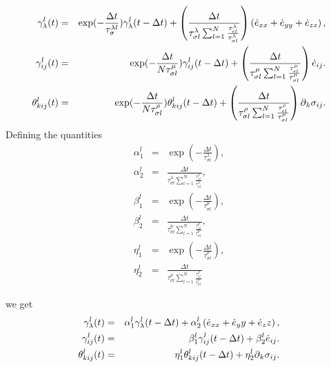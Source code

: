 \documentclass[11pt]{article}
\begin{document}
{\begin{eqnarray}
\gamma^l_{\lambda}(t) & = &
            \exp(-\frac{\Delta t}{\tau^{\lambda l}_{\sigma}})\gamma^l_{\lambda}(t-\Delta t)
            +\left(\frac{\Delta t}{\tau^{\lambda}_{\sigma l}
            \sum_{l=1}^N\frac{\tau^{\lambda}_{\epsilon l}}{\tau^{\lambda}_{\sigma l}}}\right)
             \left(\dot{e}_{xx}+ \dot{e}_{yy}+\dot{e}_{zz}\right) ,\nonumber\\
\gamma^l_{ij}(t) & = &
            \exp(-\frac{\Delta t}{N\tau^{\mu}_{\sigma l}})\gamma^l_{ij}(t-\Delta t)
            + \left(\frac{\Delta t}{\tau^{\mu}_{\sigma l}
            \sum_{l=1}^N\frac{\tau^{\mu}_{\epsilon l}}{\tau^{\mu}_{\sigma l}}}\right) \dot{e}_{ij}.\nonumber\\
\theta^l_{kij}(t) & = &
            \exp(-\frac{\Delta t}{N\tau^{\rho}_{\sigma l}})\theta^l_{kij}(t-\Delta t)
            + \left(\frac{\Delta t}{\tau^{\rho}_{\sigma l}
            \sum_{l=1}^N\frac{\tau^{\rho}_{\epsilon l}}{\tau^{\mu}_{\sigma l}}}\right) \mbox{$\partial$}_k \sigma_{ij}.\nonumber\\
\end{eqnarray}
%
Defining the quantities
\begin{eqnarray}
\alpha^l_1 & = & \exp(-\frac{\Delta t}{\tau^{\lambda}_{\sigma l}}),\\
\alpha^l_2 & = & \frac{\Delta t}{\tau^{\lambda}_{\sigma l}\sum_{l=1}^N\frac{\tau^{\lambda}_{\epsilon l}}{\tau^{\lambda}_{\sigma l}}} ,\\
\beta^l_1  & = &\exp(-\frac{\Delta t}{\tau^{\mu}_{\sigma l}}) ,\\
\beta^l_2  & = &\frac{\Delta t}{\tau^{\mu}_{\sigma l}\sum_{l=1}^N\frac{\tau^{\mu}_{\epsilon l}}{\tau^{\mu}_{\sigma l}}},\\
\eta^l_1  & = &\exp(-\frac{\Delta t}{\tau^{\rho}_{\sigma l}}) ,\\
\eta^l_2  & = &\frac{\Delta t}{\tau^{\rho}_{\sigma l}\sum_{l=1}^N\frac{\tau^{\rho}_{\epsilon l}}{\tau^{\rho}_{\sigma l}}} 
\end{eqnarray}

%
we get
\begin{eqnarray}
\gamma^l_{\lambda}(t)  & = &\alpha^l_1 \gamma^l_{\lambda}(t-\Delta t) 
                        + \alpha^l_2\left( \dot{e}_{xx}+ \dot{e}_yy+\dot{e}_zz\right) ,\nonumber \\
\gamma^l_{ij}(t)      & = &\beta^l_1 \gamma^l_{ij}(t - \Delta t) 
                        + \beta^l_2\dot{e}_{ij}.\nonumber\\
\theta^l_{kij}(t)      & = &\eta^l_{1} \theta^l_{kij}(t - \Delta t) 
                        + \eta^l_2\mbox{$\partial$}_k \sigma_{ij}.\nonumber\\
\end{eqnarray}
%
}
\end{document}
